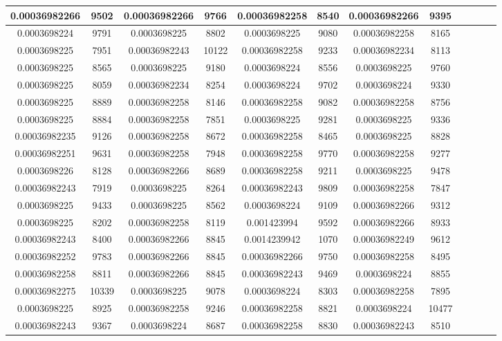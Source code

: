 \begin{table}[h]
\begin{tabular}{|c|c|c|c|c|c|c|c|c|c|c|c|}
\midrule
0.00036982266&9502&0.00036982266&9766&0.00036982258&8540&0.00036982266&9395\\
\midrule
0.0003698224&9791&0.0003698225&8802&0.0003698225&9080&0.00036982258&8165\\
\midrule
0.0003698225&7951&0.00036982243&10122&0.00036982258&9233&0.00036982234&8113\\
\midrule
0.0003698225&8565&0.0003698225&9180&0.0003698224&8556&0.0003698225&9760\\
\midrule
0.0003698225&8059&0.00036982234&8254&0.0003698224&9702&0.0003698224&9330\\
\midrule
0.0003698225&8889&0.00036982258&8146&0.00036982258&9082&0.00036982258&8756\\
\midrule
0.0003698225&8884&0.00036982258&7851&0.0003698225&9281&0.0003698225&9336\\
\midrule
0.00036982235&9126&0.00036982258&8672&0.00036982258&8465&0.0003698225&8828\\
\midrule
0.00036982251&9631&0.00036982258&7948&0.00036982258&9770&0.00036982258&9277\\
\midrule
0.0003698226&8128&0.00036982266&8689&0.00036982258&9211&0.0003698225&9478\\
\midrule
0.00036982243&7919&0.0003698225&8264&0.00036982243&9809&0.00036982258&7847\\
\midrule
0.0003698225&9433&0.0003698225&8562&0.0003698224&9109&0.00036982266&9312\\
\midrule
0.0003698225&8202&0.00036982258&8119&0.001423994&9592&0.00036982266&8933\\
\midrule
0.00036982243&8400&0.00036982266&8845&0.0014239942&1070&0.00036982249&9612\\
\midrule
0.00036982252&9783&0.00036982266&8845&0.00036982266&9750&0.00036982258&8495\\
\midrule
0.00036982258&8811&0.00036982266&8845&0.00036982243&9469&0.0003698224&8855\\
\midrule
0.00036982275&10339&0.0003698225&9078&0.0003698224&8303&0.00036982258&7895\\
\midrule
0.0003698225&8925&0.00036982258&9246&0.00036982258&8821&0.0003698224&10477\\
\midrule
0.00036982243&9367&0.0003698224&8687&0.00036982258&8830&0.00036982243&8510\\
\midrule
\end{tabular}
    
\end{table}


